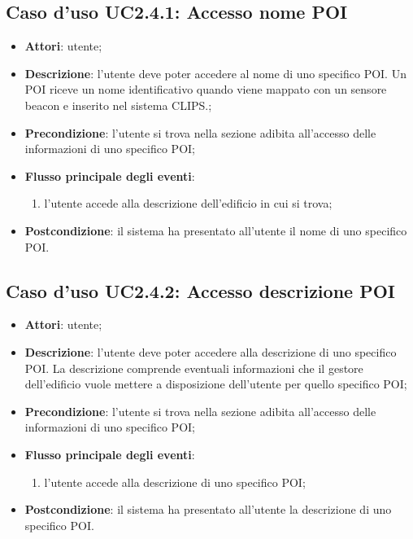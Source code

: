 \documentclass[../AnalisiDeiRequisiti.tex]{subfiles}
\begin{document}
\subsection{Caso d'uso UC2.4.1: Accesso nome POI}
\begin{itemize}
\item \textbf{Attori}: utente;
\item \textbf{Descrizione}: l'utente deve poter accedere al nome di uno specifico POI. Un POI riceve un nome identificativo quando viene mappato con un sensore beacon e inserito nel sistema CLIPS.; 
      \item \textbf{Precondizione}: l'utente si trova nella sezione adibita all'accesso delle informazioni di uno specifico POI;

        \item \textbf{Flusso principale degli eventi}:
          \begin{enumerate}
          \item l'utente accede alla descrizione dell'edificio in cui si trova;

      \end{enumerate}
    \item \textbf{Postcondizione}: il sistema ha presentato all'utente il nome di uno specifico POI.
  \end{itemize}
\hypertarget{UC2.4.2}{}
\subsection{Caso d'uso UC2.4.2: Accesso descrizione POI}
\begin{itemize}
\item \textbf{Attori}: utente;
\item \textbf{Descrizione}: l'utente deve poter accedere alla descrizione di uno specifico POI. La descrizione comprende eventuali informazioni che il gestore dell'edificio vuole mettere a disposizione dell'utente per quello specifico POI; 
      \item \textbf{Precondizione}: l'utente si trova nella sezione adibita all'accesso delle informazioni di uno specifico POI;

        \item \textbf{Flusso principale degli eventi}:
          \begin{enumerate}
          \item l'utente accede alla descrizione di uno specifico POI;

      \end{enumerate}
    \item \textbf{Postcondizione}: il sistema ha presentato all'utente la descrizione di uno specifico POI.
  \end{itemize}
\hypertarget{UC3}{}
\end{document}
